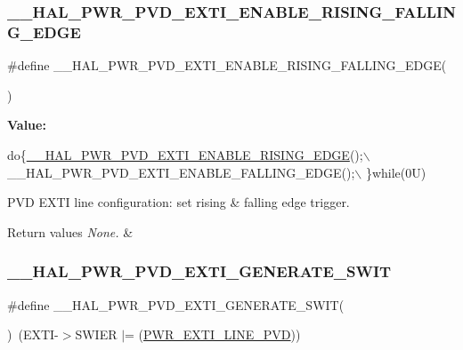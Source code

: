 \subsubsection{\texorpdfstring{\+\_\+\+\_\+\+H\+A\+L\+\_\+\+P\+W\+R\+\_\+\+P\+V\+D\+\_\+\+E\+X\+T\+I\+\_\+\+E\+N\+A\+B\+L\+E\+\_\+\+R\+I\+S\+I\+N\+G\+\_\+\+F\+A\+L\+L\+I\+N\+G\+\_\+\+E\+D\+GE}{\_\_HAL\_PWR\_PVD\_EXTI\_ENABLE\_RISING\_FALLING\_EDGE}}
{\footnotesize\ttfamily \#define \+\_\+\+\_\+\+H\+A\+L\+\_\+\+P\+W\+R\+\_\+\+P\+V\+D\+\_\+\+E\+X\+T\+I\+\_\+\+E\+N\+A\+B\+L\+E\+\_\+\+R\+I\+S\+I\+N\+G\+\_\+\+F\+A\+L\+L\+I\+N\+G\+\_\+\+E\+D\+GE(\begin{DoxyParamCaption}{ }\end{DoxyParamCaption})}

{\bfseries Value\+:}
\begin{DoxyCode}
\textcolor{keywordflow}{do}\{\hyperlink{group___p_w_r___exported___macro_ga7bef3f30c9fe267c99d5240fbf3f878c}{\_\_HAL\_PWR\_PVD\_EXTI\_ENABLE\_RISING\_EDGE}();\(\backslash\)
                                                             \_\_HAL\_PWR\_PVD\_EXTI\_ENABLE\_FALLING\_EDGE();\(\backslash\)
                                                            \}\textcolor{keywordflow}{while}(0U)
\end{DoxyCode}


P\+VD E\+X\+TI line configuration\+: set rising \& falling edge trigger. 


\begin{DoxyRetVals}{Return values}
{\em None.} & \\
\hline
\end{DoxyRetVals}
\mbox{\label{group___p_w_r___exported___macro_gaba4a7968f5c4c4ca6a7047b147ba18d4}} 
\subsubsection{\texorpdfstring{\+\_\+\+\_\+\+H\+A\+L\+\_\+\+P\+W\+R\+\_\+\+P\+V\+D\+\_\+\+E\+X\+T\+I\+\_\+\+G\+E\+N\+E\+R\+A\+T\+E\+\_\+\+S\+W\+IT}{\_\_HAL\_PWR\_PVD\_EXTI\_GENERATE\_SWIT}}
{\footnotesize\ttfamily \#define \+\_\+\+\_\+\+H\+A\+L\+\_\+\+P\+W\+R\+\_\+\+P\+V\+D\+\_\+\+E\+X\+T\+I\+\_\+\+G\+E\+N\+E\+R\+A\+T\+E\+\_\+\+S\+W\+IT(\begin{DoxyParamCaption}{ }\end{DoxyParamCaption})~(E\+X\+TI-\/$>$S\+W\+I\+ER $\vert$= (\hyperlink{group___p_w_r___p_v_d___e_x_t_i___line_ga43a49255649e03d2d2b6b12c5c379d2b}{P\+W\+R\+\_\+\+E\+X\+T\+I\+\_\+\+L\+I\+N\+E\+\_\+\+P\+VD}))}



